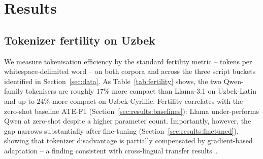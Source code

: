 \documentclass[runningheads]{llncs}
\begin{document}
\section{Results}
\label{sec:results}

\subsection{Tokenizer fertility on Uzbek}
\label{sec:results:fertility}

\begin{table}[!htbp]
\centering
\caption{Tokenizer fertility (tokens per whitespace-separated word) on
Uzbek text, computed on the UzABSA annotated set and on the 5{,}038-review
multi-domain corpus, broken down by dominant script. Lower is better.
Qwen-family tokenisers are markedly more compact on Uzbek-Latin than the
Llama tokeniser, especially in the Cyrillic buckets.}
\label{tab:fertility}
\renewcommand{\arraystretch}{1.1}
\setlength{\tabcolsep}{4pt}
\end{table}

We measure tokenisation efficiency by the standard fertility metric --
tokens per whitespace-delimited word -- on both corpora and across the
three script buckets identified in Section~\ref{sec:data}. As
Table~\ref{tab:fertility} shows, the two Qwen-family tokenisers are
roughly $17\%$ more compact than Llama-3.1 on Uzbek-Latin and up to
$24\%$ more compact on Uzbek-Cyrillic. Fertility correlates with the
zero-shot baseline ATE-F1 (Section~\ref{sec:results:baselines}): Llama
under-performs Qwen at zero-shot despite a higher parameter count.
Importantly, however, the gap narrows substantially after fine-tuning
(Section~\ref{sec:results:finetuned}), showing that tokenizer disadvantage
is partially compensated by gradient-based adaptation -- a finding
consistent with cross-lingual transfer
results~\cite{blasi-etal-2022-systematic}.
\end{document}
